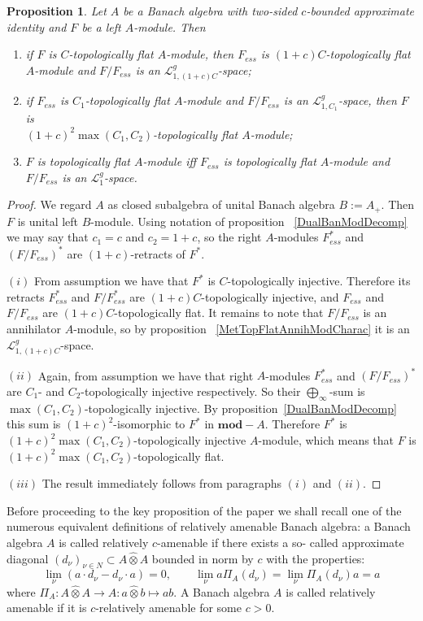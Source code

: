 \documentclass[12pt]{article}
\newtheorem{proposition}[theorem]{Proposition}
\newcommand{\projtens}{\mathbin{\widehat{\otimes}}}
\begin{document}
\begin{proposition}\label{TopFlatModCharac} Let $A$ be a Banach algebra with
two-sided $c$-bounded approximate identity and $F$ be a left $A$-module. Then
\begin{enumerate}[label = (\roman*)]
\item if $F$ is $C$-topologically flat $A$-module, then $F_{ess}$ is
$(1+c)C$-topologically flat $A$-module and $F/F_{ess}$ is an
$\mathcal{L}_{1,(1+c)C}^g$-space;
\item if $F_{ess}$ is $C_1$-topologically flat $A$-module and $F/F_{ess}$ is an
$\mathcal{L}_{1,C_1}^g$-space, then $F$ is\\ ${(1+c)}^2\max(C_1,
C_2)$-topologically flat $A$-module;
\item $F$ is topologically flat $A$-module iff $F_{ess}$  is topologically flat
$A$-module and $F/F_{ess}$ is an $\mathcal{L}_1^g$-space.
\end{enumerate}
\end{proposition}
\begin{proof} We regard $A$ as closed subalgebra of unital Banach algebra
$B:=A_+$. Then $F$ is unital left $B$-module. Using notation of proposition
~\ref{DualBanModDecomp} we may say that $c_1=c$ and $c_2=1+c$, so the right
$A$-modules $F_{ess}^*$ and ${(F/F_{ess})}^*$ are $(1+c)$-retracts of $F^*$.

$(i)$ From assumption we have that $F^*$ is $C$-topologically injective.
Therefore its retracts $F_{ess}^*$ and $F/F_{ess}^*$ are $(1+c)C$-topologically
injective, and $F_{ess}$ and $F/F_{ess}$ are $(1+c)C$-topologically flat. It
remains to note that $F/F_{ess}$ is an annihilator $A$-module, so by proposition
~\ref{MetTopFlatAnnihModCharac} it is an $\mathcal{L}_{1,(1+c)C}^g$-space.

$(ii)$ Again, from assumption we have that right $A$-modules $F_{ess}^*$ and
${(F/F_{ess})}^*$ are $C_1$- and $C_2$-topologically injective respectively. So
their $\bigoplus_\infty$-sum is $\max(C_1,C_2)$-topologically injective. By
proposition~\ref{DualBanModDecomp} this sum is ${(1+c)}^2$-isomorphic to $F^*$
in $\mathbf{mod}-A$. Therefore $F^*$ is ${(1+c)}^2\max(C_1, C_2)$-topologically
injective $A$-module, which means that $F$ is ${(1+c)}^2\max(C_1,
C_2)$-topologically flat.

$(iii)$ The result immediately follows from paragraphs $(i)$ and $(ii)$.
\end{proof}

Before proceeding to the key proposition of the paper we shall recall one of the
numerous equivalent definitions of relatively amenable Banach algebra: a Banach
algebra $A$ is called relatively $c$-amenable if there exists a so- called
approximate diagonal ${(d_\nu)}_{\nu\in N}\subset A\projtens A$ bounded in norm
by $c$ with the properties:
\[
\lim_\nu(a\cdot d_\nu-d_\nu\cdot a)=0,
\qquad 
\lim_\nu a \Pi_A(d_\nu)=\lim_\nu\Pi_A(d_\nu)a=a
\]
where $\Pi_A:A\projtens A\to A:a\projtens b\mapsto ab$. A Banach algebra $A$ is
called relatively amenable if it is $c$-relatively amenable for some $c>0$.
\end{document}
